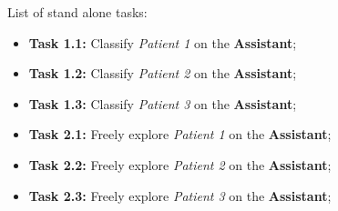\hfill


List of stand alone tasks:


\hfill

\begin{itemize}
\item[] \textbf{Task 1.1:} Classify \textit{Patient 1} on the \textbf{Assistant};
\item[] \textbf{Task 1.2:} Classify \textit{Patient 2} on the \textbf{Assistant};
\item[] \textbf{Task 1.3:} Classify \textit{Patient 3} on the \textbf{Assistant};
\end{itemize}

\hfill

\begin{itemize}
\item[] \textbf{Task 2.1:} Freely explore \textit{Patient 1} on the \textbf{Assistant};
\item[] \textbf{Task 2.2:} Freely explore \textit{Patient 2} on the \textbf{Assistant};
\item[] \textbf{Task 2.3:} Freely explore \textit{Patient 3} on the \textbf{Assistant};
\end{itemize}

\hfill


\clearpage